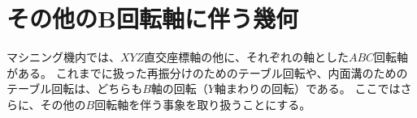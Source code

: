 \chapter[その他のB回転軸に伴う幾何]
        {その他のB回転軸に伴う幾何}
マシニング機内では、$XYZ$直交座標軸の他に、それぞれの軸とした$ABC$回転軸がある。
これまでに扱った再振分けのためのテーブル回転や、内面溝のためのテーブル回転は、どちらも$B$軸の回転（$Y$軸まわりの回転）である。
ここではさらに、その他の$B$回転軸を伴う事象を取り扱うことにする。



